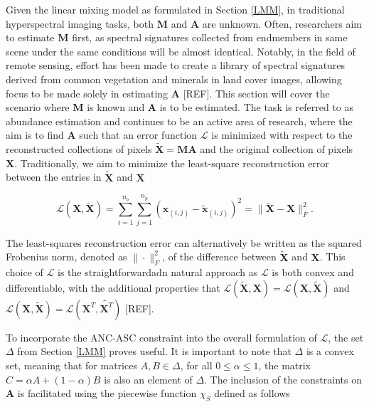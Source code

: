 Given the linear mixing model as formulated in Section \ref{LMM}, in traditional hyperspectral imaging tasks, both $\mathbf{M}$ and $\mathbf{A}$ are unknown. Often, researchers aim to estimate $\mathbf{M}$ first, as spectral signatures collected from endmembers in same scene under the same conditions will be almost identical. Notably, in the field of remote sensing, effort has been made to create a library of spectral signatures derived from common vegetation and minerals in land cover images, allowing focus to be made solely in estimating $\mathbf{A}$ [REF]. This section will cover the scenario where $\mathbf{M}$ is known and $\mathbf{A}$ is to be estimated. The task is referred to as abundance estimation and continues to be an active area of research, where the aim is to find $\mathbf{A}$ such that an error function $\mathcal{L}$ is minimized with respect to the reconstructed collections of pixels $\tilde{\mathbf{X}} = \mathbf{MA}$ and the original collection of pixels $\mathbf{X}$. Traditionally, we aim to minimize the least-square reconstruction error between the entries in $\tilde{\mathbf{X}}$ and $\mathbf{X}$

\begin{equation}
    \label{ae:fnorm}
    \mathcal{L}(\mathbf{X},\tilde{\mathbf{X}}) = \sum_{i=1}^{n_b} \sum_{j=1}^{n_p} \left(\mathbf{x}_{(i,j)} - \tilde{\mathbf{x}}_{(i,j)}\right)^2 = \|\tilde{\mathbf{X}} - \mathbf{X}\|_F^2.
\end{equation}

The least-squares reconstruction error can alternatively be written as the squared Frobenius norm, denoted as $\|\cdot\|_F^2$, of the difference between  $\tilde{\mathbf{X}}$ and $\mathbf{X}$. This choice of $\mathcal{L}$ is the straightforwardadn natural approach as $\mathcal{L}$ is both convex and differentiable, with the additional properties that $\mathcal{L}(\tilde{\mathbf{X}},\mathbf{X}) = \mathcal{L}(\mathbf{X},\tilde{\mathbf{X}})$ and $ \mathcal{L}(\mathbf{X},\tilde{\mathbf{X}}) = \mathcal{L}(\mathbf{X}^T,\tilde{\mathbf{X}^T})$ [REF].

To incorporate the ANC-ASC constraint into the overall formulation of $\mathcal{L}$, the set $\Delta$ from Section \ref{LMM} proves useful. It is important to note that $\Delta$ is a convex set, meaning that for matrices $A, B \in \Delta$, for all $0 \leq \alpha \leq 1$, the matrix $C = \alpha A + (1- \alpha)B$ is also an element of $\Delta$. The inclusion of the constraints on $\mathbf{A}$ is facilitated using the piecewise function $\chi_S$ defined as follows

